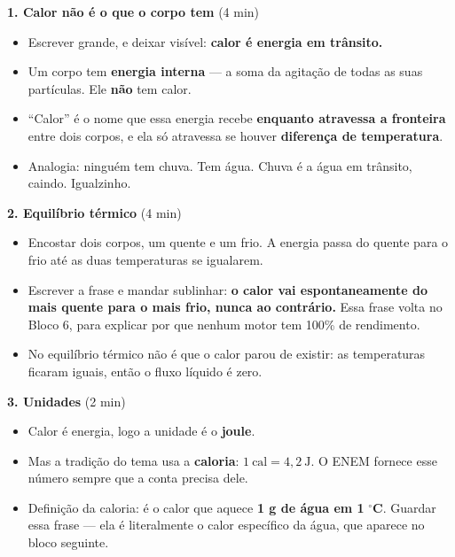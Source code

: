 \documentclass[11pt,a4paper]{article}
\begin{document}
\begin{quadro}
\textbf{1. Calor n\~ao \'e o que o corpo tem} (4 min)
\begin{itemize}[nosep]
  \item Escrever grande, e deixar vis\'ivel:
        \textbf{calor \'e energia em tr\^ansito.}
  \item Um corpo tem \textbf{energia interna} --- a soma da agita\c{c}\~ao de
        todas as suas part\'iculas. Ele \textbf{n\~ao} tem calor.
  \item ``Calor'' \'e o nome que essa energia recebe \textbf{enquanto
        atravessa a fronteira} entre dois corpos, e ela s\'o atravessa se
        houver \textbf{diferen\c{c}a de temperatura}.
  \item Analogia: ningu\'em tem chuva. Tem \'agua. Chuva \'e a \'agua em
        tr\^ansito, caindo. Igualzinho.
\end{itemize}

\medskip
\textbf{2. Equil\'ibrio t\'ermico} (4 min)
\begin{itemize}[nosep]
  \item Encostar dois corpos, um quente e um frio. A energia passa do
        quente para o frio at\'e as duas temperaturas se igualarem.
  \item Escrever a frase e mandar sublinhar: \textbf{o calor vai
        espontaneamente do mais quente para o mais frio, nunca ao
        contr\'ario.} Essa frase volta no Bloco 6, para explicar por que
        nenhum motor tem 100\% de rendimento.
  \item No equil\'ibrio t\'ermico n\~ao \'e que o calor parou de existir: as
        temperaturas ficaram iguais, ent\~ao o fluxo l\'iquido \'e zero.
\end{itemize}

\medskip
\textbf{3. Unidades} (2 min)
\begin{itemize}[nosep]
  \item Calor \'e energia, logo a unidade \'e o \textbf{joule}.
  \item Mas a tradi\c{c}\~ao do tema usa a \textbf{caloria}:
        $1\ \text{cal} = 4{,}2\ \text{J}$. O ENEM fornece esse n\'umero
        sempre que a conta precisa dele.
  \item Defini\c{c}\~ao da caloria: \'e o calor que aquece \textbf{1 g de \'agua
        em 1} $^\circ$\textbf{C}. Guardar essa frase --- ela \'e
        literalmente o calor espec\'ifico da \'agua, que aparece no bloco
        seguinte.
\end{itemize}
\end{quadro}
\end{document}
